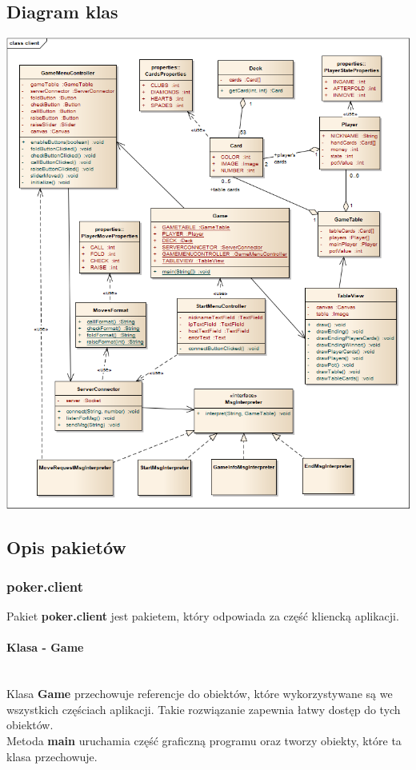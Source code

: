 \documentclass{article}
\newcommand{\mparagraph}[1]{\paragraph{#1}\mbox{}\vspace{2mm}\\}
\begin{document}
    \subsection{Diagram klas}
        \begin{center}
            \includegraphics[width=\textwidth]{class_client.png}
        \end{center}
    
    \subsection{Opis pakietów}
        
        \subsubsection{poker.client}
            Pakiet \textbf{poker.client} jest pakietem, który odpowiada za część kliencką aplikacji.
            
            \mparagraph{Klasa - Game}
                Klasa \textbf{Game} przechowuje referencje do obiektów, które wykorzystywane są we wszystkich częściach aplikacji.
                Takie rozwiązanie zapewnia łatwy dostęp do tych obiektów.
                \\
                Metoda \textbf{main} uruchamia część graficzną programu oraz tworzy obiekty, które ta klasa przechowuje.
        
\end{document}
